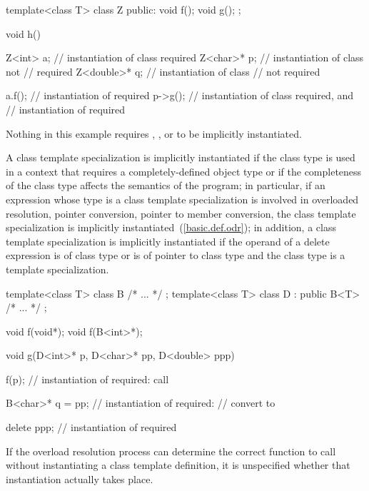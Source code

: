 \pnum
\enterexample
\begin{codeblock}
template<class T> class Z {
public:
	void f();
	void g();
};

void h()
{
	Z<int> a;		// instantiation of class  required
	Z<char>* p;		// instantiation of class  not
				// required
	Z<double>* q;		// instantiation of class 
				// not required

	a.f();			// instantiation of  required
	p->g();			// instantiation of class  required, and
				// instantiation of  required
}
\end{codeblock}

Nothing in this example requires
,
,
or
to be implicitly instantiated.
\exitexample

\pnum
A class template specialization is implicitly instantiated if the
class type is used in a context that requires a completely-defined
object type or if the completeness of the class type affects the
semantics of the program;
in particular, if an expression whose type is a class template
specialization is involved in overloaded resolution, pointer conversion,
pointer to member conversion, the class template specialization is
implicitly instantiated~(\ref{basic.def.odr});
in addition, a class template specialization is implicitly instantiated
if the operand of a delete expression is of class type or is of pointer
to class type and the class type is a template specialization.
\enterexample

\begin{codeblock}
template<class T> class B { /* ... */ };
template<class T> class D : public B<T> { /* ... */ };

void f(void*);
void f(B<int>*);

void g(D<int>* p, D<char>* pp, D<double> ppp)
{
	f(p);			// instantiation of  required: call 

	B<char>* q = pp;	// instantiation of  required:
				// convert  to 

	delete ppp;		// instantiation of  required
}
\end{codeblock}
\exitexampleb

\pnum
If the overload resolution process can determine the correct function to
call without instantiating a class template definition, it is unspecified
whether that instantiation actually takes place.
\enterexample

